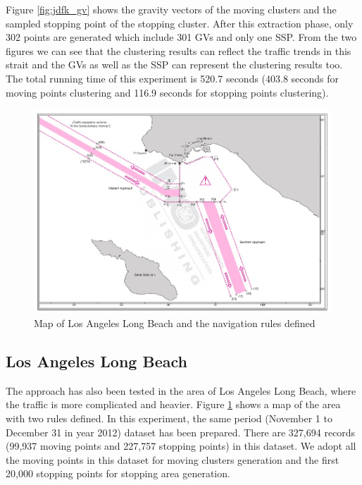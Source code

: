 \documentclass[12pt,glossary]{dalcsthesis}
\begin{document}
Figure \ref{fig:jdfk_gv} shows the gravity vectors of the moving clusters and the sampled stopping point of the stopping cluster. After this extraction phase, only 302 points are generated which include 301 GVs and only one SSP. From the two figures we can see that the clustering results can reflect the traffic trends in this strait and the GVs as well as the SSP can represent the clustering results too. The total running time of this experiment is 520.7 seconds (403.8 seconds for moving points clustering and 116.9 seconds for stopping points clustering).

\begin{figure}[!htb]
\centering
\includegraphics[width=4.6in]{la_pic.png}
\caption{Map of Los Angeles Long Beach and the navigation rules defined \cite{anabook}}
\label{fig:la_pic}
\end{figure}

\subsection{Los Angeles Long Beach}
\label{sec:exp_1.2}
The approach has also been tested in the area of Los Angeles Long Beach, where the traffic is more complicated and heavier. Figure \ref{fig:la_pic} shows a map of the area with two rules defined. In this experiment, the same period (November 1 to December 31 in year 2012) dataset has been prepared. There are 327,694 records (99,937 moving points and 227,757 stopping points) in this dataset. We adopt all the moving points in this dataset for moving clusters generation and the first 20,000 stopping points for stopping area generation.
\end{document}
